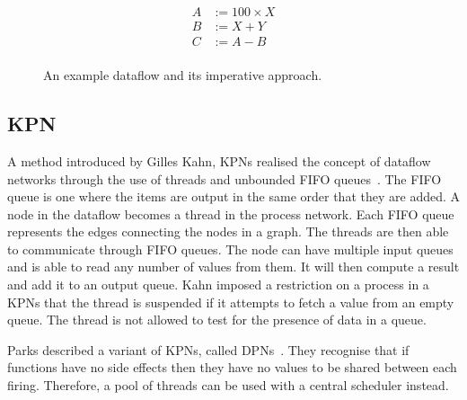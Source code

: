 \documentclass[dissertation.tex]{subfiles}
\begin{document}
\begin{figure}[ht]
  \centering
  \begin{subfigure}{0.3\textwidth}
    \centering
    \begin{equation*}
      \begin{aligned}
      A &:= 100 \times X \\
      B &:= X + Y \\
      C &:= A - B \\
      \end{aligned}
    \end{equation*}
    \caption{}
    \label{subfig:dataflow-example-equations}
  \end{subfigure}
  \begin{subfigure}{0.3\textwidth}
    \centering
    
    \caption{}
    \label{subfig:dataflow-example-diagram}
  \end{subfigure}
  \caption{An example dataflow and its imperative approach.}
    \label{fig:dataflow-example}
\end{figure}


\subsection{\ac{KPN}}
A method introduced by Gilles Kahn, \acfp{KPN} realised the concept of dataflow networks
through the use of threads and unbounded \ac{FIFO} queues~\cite{DBLP:conf/ifip/Kahn74}.
The \ac{FIFO} queue is one where the items are output in the same order that they are added.
A node in the dataflow becomes a thread in the process network.
Each \ac{FIFO} queue represents the edges connecting the nodes in a graph.
The threads are then able to communicate through \ac{FIFO} queues.
The node can have multiple input queues and is able to read any number of values from them.
It will then compute a result and add it to an output queue.
Kahn imposed a restriction on a process in a \acp{KPN} that the thread is suspended if it attempts to fetch a value from an empty queue.
The thread is not allowed to test for the presence of data in a queue.

Parks described a variant of \acp{KPN}, called \acp{DPN}~\cite{381846}.
They recognise that if functions have no side effects then they have no values to be shared between each firing.
Therefore, a pool of threads can be used with a central scheduler instead.

\end{document}
